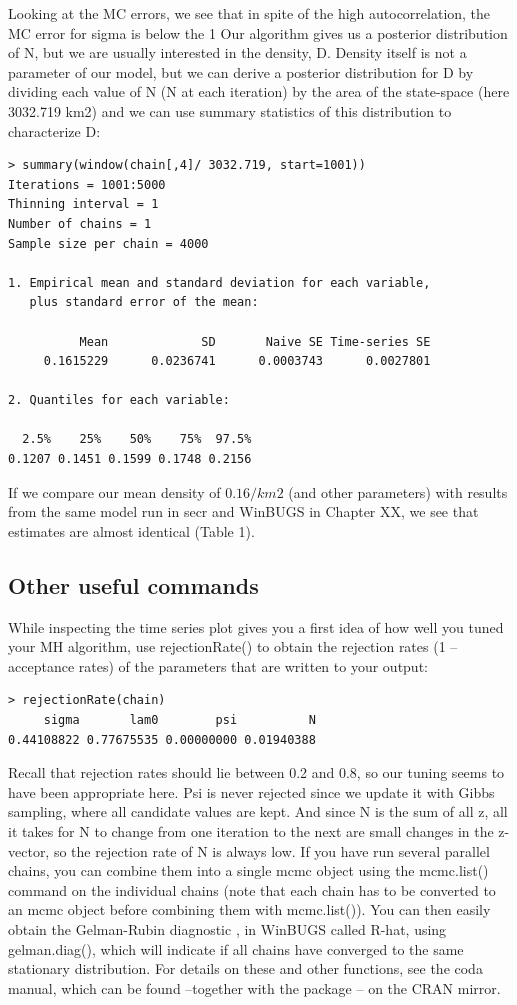 Looking at the MC errors, we see that in spite of the high autocorrelation, the MC error for sigma is below the 1%
Our algorithm gives us a posterior distribution of N, but we are usually interested in the density, D. Density itself is not a parameter of our model, but we can derive a posterior distribution for D by dividing each value of N (N at each iteration) by the area of the state-space (here 3032.719 km2) and we can use summary statistics of this distribution to characterize D:
\begin{verbatim}
> summary(window(chain[,4]/ 3032.719, start=1001))
Iterations = 1001:5000
Thinning interval = 1
Number of chains = 1
Sample size per chain = 4000

1. Empirical mean and standard deviation for each variable,
   plus standard error of the mean:

          Mean             SD       Naive SE Time-series SE
     0.1615229      0.0236741      0.0003743      0.0027801

2. Quantiles for each variable:

  2.5%    25%    50%    75%  97.5%
0.1207 0.1451 0.1599 0.1748 0.2156
\end{verbatim}
If we compare our mean density of $0.16/km2$ (and other parameters) with results from the same model run in secr and WinBUGS in Chapter XX, we see that estimates are almost identical (Table 1).


\subsection{Other useful commands }
While inspecting the time series plot gives you a first idea of how well you tuned your MH algorithm, use rejectionRate() to obtain the rejection rates (1 – acceptance rates) of the parameters that are written to your output:
\begin{verbatim}
> rejectionRate(chain)
     sigma       lam0        psi          N
0.44108822 0.77675535 0.00000000 0.01940388
\end{verbatim}
 Recall that rejection rates should lie between 0.2 and 0.8, so our tuning seems to have been appropriate here. Psi is never rejected since we update it with Gibbs sampling, where all candidate values are kept. And since N is the sum of all z, all it takes for N to change from one iteration to the next are small changes in the z-vector, so the rejection rate of N is always low.
If you have run several parallel chains, you can combine them into a single mcmc object using the mcmc.list() command on the individual chains (note that each chain has to be converted to an mcmc object before combining them with mcmc.list()). You can then easily obtain the Gelman-Rubin diagnostic \citep{gelman_etal:2004}, in WinBUGS called R-hat, using gelman.diag(), which will indicate if all chains have converged to the same stationary distribution.
For details on these and other functions, see the coda manual, which can be found –together with the package – on the CRAN mirror.

